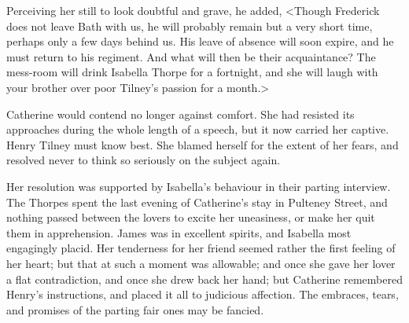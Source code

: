  Perceiving her still to look doubtful and grave, he added, <Though Frederick does not leave Bath with us, he will probably remain but a very short time, perhaps only a few days behind us. His leave of absence will soon expire, and he must return to his regiment. And what will then be their acquaintance? The mess-room will drink Isabella Thorpe for a fortnight, and she will laugh with your brother over poor Tilney's passion for a month.> 

 Catherine would contend no longer against comfort. She had resisted its approaches during the whole length of a speech, but it now carried her captive. Henry Tilney must know best. She blamed herself for the extent of her fears, and resolved never to think so seriously on the subject again. 

 Her resolution was supported by Isabella's behaviour in their parting interview. The Thorpes spent the last evening of Catherine's stay in Pulteney Street, and nothing passed between the lovers to excite her uneasiness, or make her quit them in apprehension. James was in excellent spirits, and Isabella most engagingly placid. Her tenderness for her friend seemed rather the first feeling of her heart; but that at such a moment was allowable; and once she gave her lover a flat contradiction, and once she drew back her hand; but Catherine remembered Henry's instructions, and placed it all to judicious affection. The embraces, tears, and promises of the parting fair ones may be fancied. 